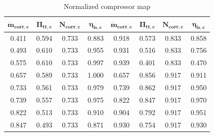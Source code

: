 \begin{longtable}[c]{@{}cccc|cccc@{}}
\caption{Normalized compressor map}
\label{tab:C7_compmap}\\
\toprule
$\mathbf{\dot{m}_{corr,c}}$ & $\mathbf{\Pi_{tt,c}}$ & $\mathbf{N_{corr,c}}$ & $\mathbf{\eta_{is,c}}$ & $\mathbf{\dot{m}_{corr,c}}$ & $\mathbf{\Pi_{tt,c}}$ & $\mathbf{N_{corr,c}}$ & $\mathbf{\eta_{is,c}}$ \\* \midrule
\endfirsthead
%
\endhead
%
\bottomrule
\endfoot
%
\endlastfoot
%
0.411                            & 0.594                      & 0.733                 & 0.883                       & 0.918                            & 0.573                      & 0.833                 & 0.858                       \\
0.493                            & 0.610                      & 0.733                 & 0.955                       & 0.931                            & 0.516                      & 0.833                 & 0.756                       \\
0.575                            & 0.610                      & 0.733                 & 0.997                       & 0.939                            & 0.401                      & 0.833                 & 0.470                       \\
0.657                            & 0.589                      & 0.733                 & 1.000                       & 0.657                            & 0.856                      & 0.917                 & 0.911                       \\
0.733                            & 0.561                      & 0.733                 & 0.979                       & 0.739                            & 0.862                      & 0.917                 & 0.950                       \\
0.739                            & 0.557                      & 0.733                 & 0.975                       & 0.822                            & 0.847                      & 0.917                 & 0.970                       \\
0.822                            & 0.513                      & 0.733                 & 0.910                       & 0.904                            & 0.792                      & 0.917                 & 0.951                       \\
0.847                            & 0.493                      & 0.733                 & 0.871                       & 0.930                            & 0.754                      & 0.917                 & 0.930                       \\

\end{longtable}
